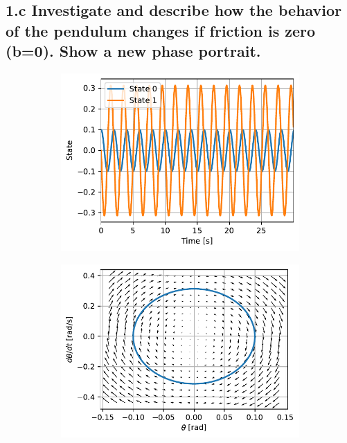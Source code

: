 \documentclass{cmc}
\begin{document}
\subsection*{1.c Investigate and describe how the behavior of the pendulum
  changes if friction is zero (b=0).  Show a new phase portrait.}


\begin{figure}[H]
  \centering
  \begin{subfigure}[b]{0.49\textwidth}
    { \centering
      \includegraphics[width=\textwidth]{figures/State_without_damping_(x0=[0dot1,_0])}
      \label{fig:pendulum-no-friction-state}
    }
    \caption{}
  \end{subfigure}
  \begin{subfigure}[b]{0.49\textwidth}
    { \centering
      \includegraphics[width=\textwidth]{figures/Phase_without_damping_(x0=[0dot1,_0])}
      \label{fig:pendulum-no-friction-phase}
    }
    \caption{}
  \end{subfigure}
  \caption{}
  \label{fig:pendulum-no-friction}
\end{figure}
\end{document}
